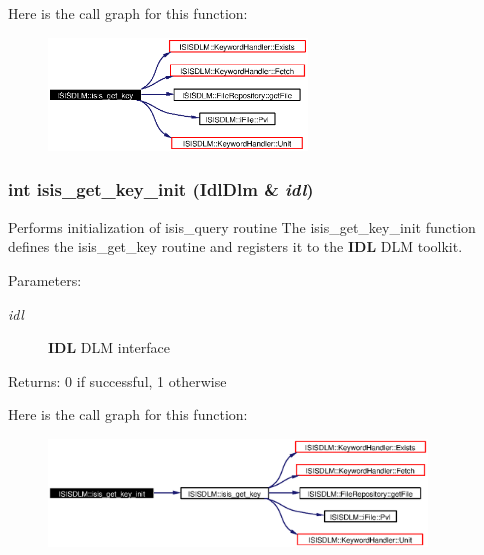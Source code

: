 Here is the call graph for this function:\begin{figure}[H]
\begin{center}
\leavevmode
\includegraphics[width=195pt]{namespaceISISDLM_a18_cgraph}
\end{center}
\end{figure}
\subsubsection{\setlength{\rightskip}{0pt plus 5cm}int isis\_\-get\_\-key\_\-init (Idl\-Dlm \& {\em idl})}\label{namespaceISISDLM_a17}


Performs initialization of isis\_\-query routine The isis\_\-get\_\-key\_\-init function defines the isis\_\-get\_\-key routine and registers it to the {\bf IDL} DLM toolkit. \begin{Desc}
\item[Parameters:]
\begin{description}
\item[{\em idl}]{\bf IDL} DLM interface \end{description}
\end{Desc}
\begin{Desc}
\item[Returns:]0 if successful, 1 otherwise \end{Desc}


Here is the call graph for this function:\begin{figure}[H]
\begin{center}
\leavevmode
\includegraphics[width=285pt]{namespaceISISDLM_a17_cgraph}
\end{center}
\end{figure}
